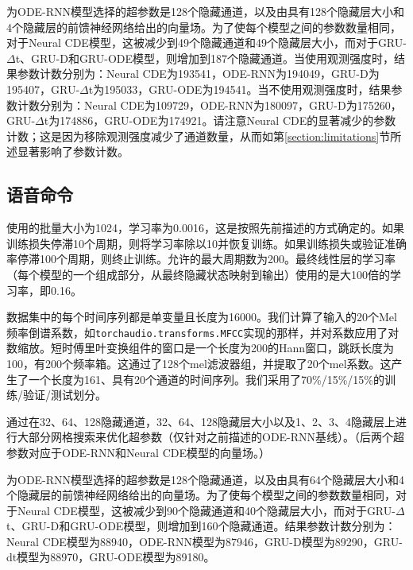 \documentclass{ctexart}
\theoremstyle{plain}
\theoremstyle{definition}
\begin{document}
	为ODE-RNN模型选择的超参数是128个隐藏通道，以及由具有128个隐藏层大小和4个隐藏层的前馈神经网络给出的向量场。为了使每个模型之间的参数数量相同，对于Neural CDE模型，这被减少到49个隐藏通道和49个隐藏层大小，而对于GRU-$\Delta$t、GRU-D和GRU-ODE模型，则增加到187个隐藏通道。当使用观测强度时，结果参数计数分别为：Neural CDE为193541，ODE-RNN为194049，GRU-D为195407，GRU-$\Delta$t为195033，GRU-ODE为194541。当不使用观测强度时，结果参数计数分别为：Neural CDE为109729，ODE-RNN为180097，GRU-D为175260，GRU-$\Delta$t为174886，GRU-ODE为174921。请注意Neural CDE的显著减少的参数计数；这是因为移除观测强度减少了通道数量，从而如第\ref{section:limitations}节所述显著影响了参数计数。
	
	\subsection{语音命令}\label{appendix:speechcommands}
	使用的批量大小为1024，学习率为0.0016，这是按照先前描述的方式确定的。如果训练损失停滞10个周期，则将学习率除以10并恢复训练。如果训练损失或验证准确率停滞100个周期，则终止训练。允许的最大周期数为200。最终线性层的学习率（每个模型的一个组成部分，从最终隐藏状态映射到输出）使用的是大100倍的学习率，即0.16。
	
	数据集中的每个时间序列都是单变量且长度为16000。我们计算了输入的20个Mel频率倒谱系数，如\texttt{torchaudio.transforms.MFCC}实现的那样，并对系数应用了对数缩放。短时傅里叶变换组件的窗口是一个长度为200的Hann窗口，跳跃长度为100，有200个频率箱。这通过了128个mel滤波器组，并提取了20个mel系数。这产生了一个长度为161、具有20个通道的时间序列。我们采用了70\%/15\%/15\%的训练/验证/测试划分。
	
	通过在32、64、128隐藏通道，32、64、128隐藏层大小以及1、2、3、4隐藏层上进行大部分网格搜索来优化超参数（仅针对之前描述的ODE-RNN基线）。（后两个超参数对应于ODE-RNN和Neural CDE模型的向量场。）
	
	为ODE-RNN模型选择的超参数是128个隐藏通道，以及由具有64个隐藏层大小和4个隐藏层的前馈神经网络给出的向量场。为了使每个模型之间的参数数量相同，对于Neural CDE模型，这被减少到90个隐藏通道和40个隐藏层大小，而对于GRU-$\Delta$t、GRU-D和GRU-ODE模型，则增加到160个隐藏通道。结果参数计数分别为：Neural CDE模型为88940，ODE-RNN模型为87946，GRU-D模型为89290，GRU-dt模型为88970，GRU-ODE模型为89180。
\end{document}
